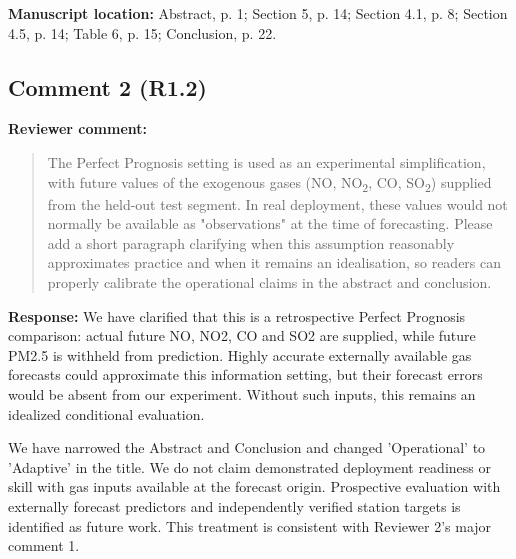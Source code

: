 \documentclass[11pt,a4paper]{article}
\begin{document}
\textbf{Manuscript location:} Abstract, p. 1; Section 5, p. 14; Section 4.1, p. 8; Section 4.5, p. 14; Table 6, p. 15; Conclusion, p. 22.
\begin{samepage}
\subsection*{Comment 2 (R1.2)}
\textbf{Reviewer comment:}
\begin{quote}\small The Perfect Prognosis setting is used as an experimental simplification, with future values of the exogenous gases (NO, NO\textsubscript{2}, CO, SO\textsubscript{2}) supplied from the held-out test segment. In real deployment, these values would not normally be available as "observations" at the time of forecasting. Please add a short paragraph clarifying when this assumption reasonably approximates practice and when it remains an idealisation, so readers can properly calibrate the operational claims in the abstract and conclusion.\end{quote}
\end{samepage}
\textbf{Response:}
We have clarified that this is a retrospective Perfect Prognosis comparison: actual future NO, NO2, CO and SO2 are supplied, while future PM2.5 is withheld from prediction. Highly accurate externally available gas forecasts could approximate this information setting, but their forecast errors would be absent from our experiment. Without such inputs, this remains an idealized conditional evaluation.

We have narrowed the Abstract and Conclusion and changed 'Operational' to 'Adaptive' in the title. We do not claim demonstrated deployment readiness or skill with gas inputs available at the forecast origin. Prospective evaluation with externally forecast predictors and independently verified station targets is identified as future work. This treatment is consistent with Reviewer 2's major comment 1.
\end{document}
